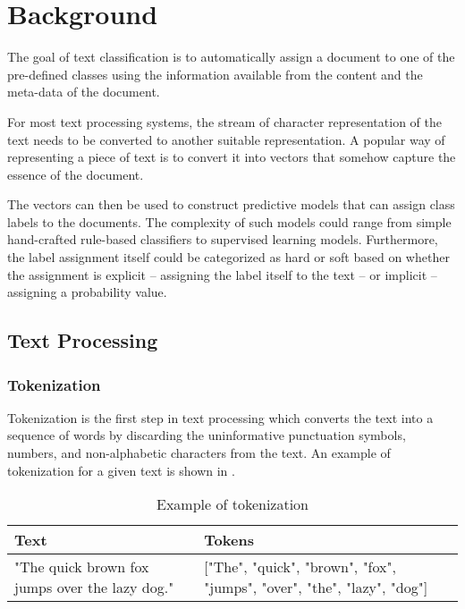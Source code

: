 \chapter{Background} \label{background}
The goal of text classification is to automatically assign a document to one of the pre-defined classes using the information available from the content and the meta-data of the document.

For most text processing systems, the stream of character representation of the text needs to be converted to another suitable representation. A popular way of representing a piece of text is to convert it into vectors that somehow capture the essence of the document. 

The vectors can then be used to construct predictive models that can assign class labels to the documents. The complexity of such models could range from simple hand-crafted rule-based classifiers to supervised learning models. Furthermore, the label assignment itself could be categorized as hard or soft based on whether the assignment is explicit -- assigning the label itself to the text -- or implicit -- assigning a probability value. 

\section{Text Processing}
\subsection{Tokenization}
Tokenization is the first step in text processing which converts the text into a sequence of words by discarding the uninformative punctuation symbols, numbers, and non-alphabetic characters from the text. An example of tokenization for a given text is shown in .

\begin{table}[h]
\begin{center}
\caption{Example of tokenization}
\label{tbl:tokenization_example}
\begin{tabular}{p{6cm}p{6cm}}
\toprule 
Text&Tokens\\
\midrule 
"The quick brown fox jumps over the lazy dog."&["The", "quick", "brown", "fox", "jumps", "over", "the", "lazy", "dog"]\\
\bottomrule
\end{tabular}
\end{center}
\end{table}


